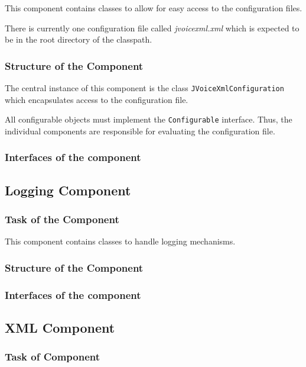 \documentclass[11pt,a4paper]{article}
\begin{document}
This component contains classes to allow for easy access to the configuration
files.

There is currently one configuration file called \emph{jvoicexml.xml}
which is expected to be in the root directory of the classpath.

\subsubsection{Structure of the Component}

The central instance of this component is the class
\texttt{JVoiceXmlConfiguration} which encapsulates access to the
configuration file.

All configurable objects must implement the \texttt{Configurable}
interface. Thus, the individual components are responsible for
evaluating the configuration file.

\subsubsection{Interfaces of the component}

\subsection{Logging Component}
\label{sec:logging-component}

\subsubsection{Task of the Component}

This component contains classes to handle logging mechanisms.

\subsubsection{Structure of the Component}

\subsubsection{Interfaces of the component}

\subsection{XML Component}
\label{sec:xml-component}

\subsubsection{Task of Component}
\end{document}
